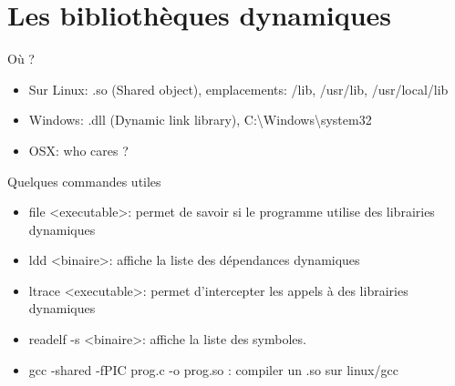 \section{Les bibliothèques dynamiques}

\frame{\tableofcontents[currentsection]}

\begin{frame}{Où ?}
	\begin{itemize}
		\item Sur Linux: .so (Shared object), emplacements: /lib, /usr/lib, /usr/local/lib
		\item Windows: .dll (Dynamic link library), C:\textbackslash Windows\textbackslash system32
		\item OSX: who cares ?
	\end{itemize}
\end{frame}

\begin{frame}{Quelques commandes utiles}
	\begin{itemize}
	    \item file <executable>: permet de savoir si le programme utilise des librairies dynamiques
		\item ldd <binaire>: affiche la liste des dépendances dynamiques
		\item ltrace <executable>: permet d'intercepter les appels à des librairies dynamiques
		\item readelf -s <binaire>: affiche la liste des symboles.
		\item gcc -shared -fPIC prog.c -o prog.so  : compiler un .so sur linux/gcc
	\end{itemize}
\end{frame}
